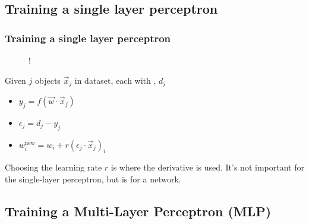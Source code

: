 \documentclass[hyperref={colorlinks=true}]{beamer}
\begin{document}
\subsection[Training a single layer perceptron]{Training a single layer perceptron}


\begin{frame}%
  \frametitle{Training a single layer perceptron}

  \begin{figure}
    \centering 
     {!} {
      
    }
  \end{figure}
  
  Given $j$ objects $\vec{x}_j$ in dataset, each with , $d_j$
  \begin{itemize}
    \item {} $y_j = f(\vec{w}\cdot\vec{x}_j)$
    \item {} $\epsilon_j = d_j - y_j$
    \item {} $w^{\mathrm{new}}_i = w_i + r ( \epsilon_j \cdot \vec{x}_j )_{i}$
  \end{itemize}
  
  Choosing the learning rate $r$ is where the derivative is used. It's not important for the single-layer perceptron, but is  for a network.
  
\end{frame}

\subsection[Training a Multi-Layer Perceptron (MLP)]{Training a Multi-Layer Perceptron (MLP)}
\end{document}
